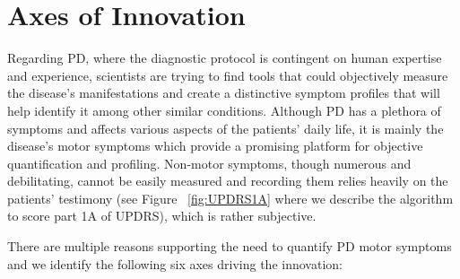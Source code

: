 
\section{Axes of Innovation}
\label{sec:axes}
Regarding PD, where the diagnostic protocol is contingent on human expertise and experience, scientists are trying to find tools that could objectively measure the disease's manifestations and create a distinctive symptom profiles that will help identify it among other similar conditions. Although \gls{PD} has a plethora of symptoms and affects various aspects of the patients' daily life, it is mainly the disease's motor symptoms which provide a promising platform for objective quantification and profiling. Non-motor symptoms, though numerous and debilitating, cannot be easily measured and recording them relies heavily on the patients' testimony (see Figure ~\ref{fig:UPDRS1A} where we describe the algorithm to score part 1A of \gls{UPDRS}), which is rather subjective. 

There are multiple reasons supporting the need to quantify \gls{PD} motor symptoms and we identify the following six axes driving the innovation:

